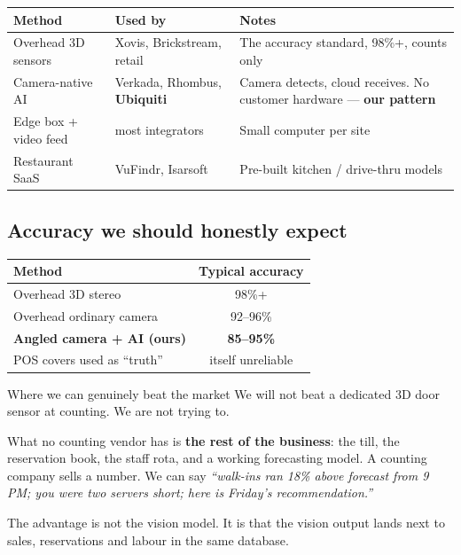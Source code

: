 \documentclass[11pt,a4paper]{article}
\begin{document}
\begin{center}
\begin{tabular}{@{}p{4.3cm}p{4.0cm}p{5.4cm}@{}}
\toprule
\textbf{Method} & \textbf{Used by} & \textbf{Notes} \\
\midrule
Overhead 3D sensors & Xovis, Brickstream, retail & The accuracy standard,
98\%+, counts only \\
Camera-native AI & Verkada, Rhombus, \textbf{Ubiquiti} & Camera detects,
cloud receives. No customer hardware --- \textbf{our pattern} \\
Edge box + video feed & most integrators & Small computer per site \\
Restaurant SaaS & VuFindr, Isarsoft & Pre-built kitchen / drive-thru models \\
\bottomrule
\end{tabular}
\end{center}

\subsection{Accuracy we should honestly expect}

\begin{center}
\begin{tabular}{@{}lc@{}}
\toprule
\textbf{Method} & \textbf{Typical accuracy} \\
\midrule
Overhead 3D stereo & 98\%+ \\
Overhead ordinary camera & 92--96\% \\
\textbf{Angled camera + AI (ours)} & \textbf{85--95\%} \\
POS covers used as ``truth'' & \textcolor{warn}{itself unreliable} \\
\bottomrule
\end{tabular}
\end{center}

\begin{note}{Where we can genuinely beat the market}
We will not beat a dedicated 3D door sensor at counting. We are not trying to.

\vspace{4pt}
What no counting vendor has is \textbf{the rest of the business}: the till,
the reservation book, the staff rota, and a working forecasting model. A
counting company sells a number. We can say \emph{``walk-ins ran 18\% above
forecast from 9 PM; you were two servers short; here is Friday's
recommendation.''}

\vspace{4pt}
The advantage is not the vision model. It is that the vision output lands
next to sales, reservations and labour in the same database.
\end{note}
\end{document}
